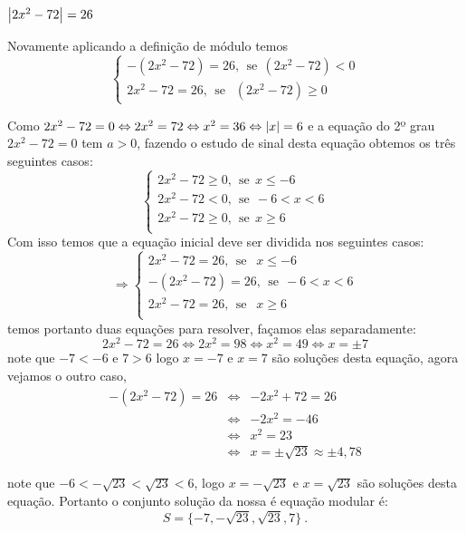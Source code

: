  \begin{exem}
  $\left|2x^2 - 72\right|= 26$

  Novamente aplicando a definição de módulo temos
    \[
    \begin{cases}
      -(2x^2-72)= 26, \ \ \text{se} \ \ (2x^2-72)<0 \\
      2x^2- 72= 26, \ \ \text{se } \ \ (2x^2-72) \geq 0
     \end{cases}
     \]

     Como $2x^2- 72= 0 \Leftrightarrow 2x^2= 72 \Leftrightarrow x^2= 36 \Leftrightarrow \left|x\right|= 6$ e a equação do 2º grau $2x^2- 72= 0$ tem $a> 0$, fazendo o estudo de sinal desta equação obtemos os três seguintes casos:
     \[
     \begin{cases}
      2x^2- 72 \geq 0, \ \ \text{se} \ \ x \leq -6 \\
      2x^2- 72 < 0, \ \ \text{se} \ \ -6 < x < 6 \\
      2x^2- 72 \geq 0, \ \ \text{se} \ \ x \geq 6 \\
     \end{cases}
     \]
     Com isso temos que a equação inicial deve ser dividida nos seguintes casos:
     \[
     \Rightarrow
      \begin{cases}
       2x^2- 72= 26, \ \ \text{se } \ \ x \leq -6 \\
      -(2x^2-72)= 26, \ \ \text{se} \ \ -6 < x < 6\\
       2x^2- 72= 26, \ \ \text{se } \ \ x \geq 6 \\
     \end{cases}
     \]
     temos portanto duas equações para resolver, façamos elas separadamente:
\begin{equation}
2x^2- 72= 26 \Leftrightarrow 2x^2= 98 \Leftrightarrow x^2= 49 \Leftrightarrow x= \pm 7
\end{equation}
     note que $-7 < -6$ e $7 > 6$ logo $x=-7$ e $x=7$ são soluções desta equação, agora vejamos o outro caso,
      \begin{eqnarray}
      -(2x^2-72)= 26 & \Leftrightarrow & -2x^2 + 72= 26\\
      & \Leftrightarrow & -2x^2= -46 \\
      & \Leftrightarrow & x^2= 23 \\
      & \Leftrightarrow & x= \pm \sqrt{23} \approx \pm 4,78
      \end{eqnarray}

note que $-6< -\sqrt{23} < \sqrt{23} < 6$, logo $x=-\sqrt{23}$ e $x=\sqrt{23}$ são soluções desta equação. Portanto o conjunto solução da nossa é equação modular é:
\begin{equation}
S= \{-7, -\sqrt{23}, \sqrt{23}, 7\} \ .
\end{equation}
\end{exem}

